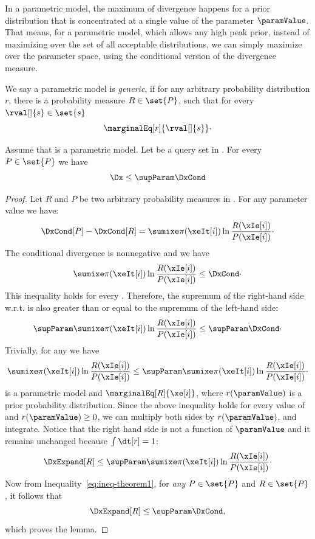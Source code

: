 

In a parametric model, the maximum of divergence happens for a prior distribution
that is concentrated at a single value of the parameter $\paramValue$.
That means, for a parametric model, which allows any high peak prior, instead of maximizing over the set of
all acceptable distributions, we can simply maximize over the parameter space, using the conditional version
of the divergence measure.

\begin{definition}
    We say a parametric model \pmodel is \emph{generic}, if for any arbitrary probability distribution $r$,
    there is a probability measure $R \in \set{P}$, such that for every $\rval[]{s} \in \set{s}$
    \[
        \marginalEq[r]{\rval[]{s}}\cdot
    \]
\end{definition}

\begin{lemma}
    \label{lm:DxP_uppper_bound}
    Assume that \pmodel is a parametric model.
    Let \Xpairs be a query set in \Mt.
    For every $P \in \set{P}$ we have
    \begin{equation*}
        \Dx \leq \supParam \DxCond
    \end{equation*}
\end{lemma}

\begin{proof}
    \newcommand{\RP}{\sumixe \pi(\xeIt[i]) \ln \frac{R(\xIe[i])}{P(\xIe[i])}}

    Let $R$ and $P$ be two arbitrary probability measures in \Mt.
    For any parameter value \paramValue we have:
    \[
        \DxCond[P] - \DxCond[R] = \RP \cdot
    \]
    The conditional divergence is nonnegative and we have
    \[
        \RP \leq \DxCond \cdot
    \]
    This inequality holds for every \paramValue.
    Therefore, the supremum of the right-hand side w.r.t. \paramValue is also greater than or equal to the
    supremum of the left-hand side:
    \begin{equation}
        \supParam \RP \leq \supParam \DxCond \cdot
        \label{eq:ineq-theorem1}
    \end{equation}
    Trivially, for any \paramValue we have
    \[
        \RP \leq \supParam \RP \cdot
    \]
    \Mt is a parametric model and $\marginalEq[R]{\xe[i]}$, where $r(\paramValue)$ is
    a prior probability distribution.
    Since the above inequality holds for every value of \paramValue and $r(\paramValue) \geq 0$, we can multiply both
    sides by $r(\paramValue)$, and integrate.
    Notice that the right hand side is not a function of $\paramValue$ and it remains unchanged
    because $\int \dt[r] = 1$:
    \[
        \DxExpand[R] \leq \supParam \RP\cdot
    \]
    Now from Inequality~\ref{eq:ineq-theorem1}, for \emph{any} $P \in \set{P}$ and $R \in \set{P}$, it
    follows that
    \[
        \DxExpand[R] \leq \supParam \DxCond,
    \]
    which proves the lemma.
\end{proof}


